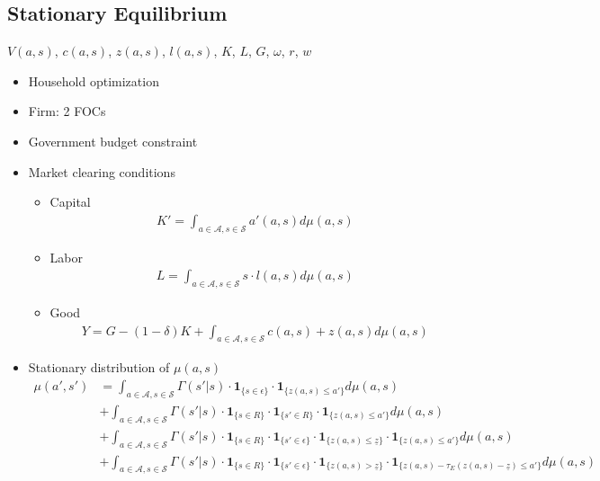 \documentclass{article}
\begin{document}
\begin{spacing}{1.5}
\subsection{Stationary Equilibrium}
$V(a,s)$, $c(a,s)$, $z(a,s)$, $l(a,s)$, $K$, $L$, $G$, $\omega$, $r$, $w$
\begin{itemize}
\item Household optimization
\item Firm: 2 FOCs
\item Government budget constraint
\item Market clearing conditions
\begin{itemize}
\item Capital
\begin{align*}
K'=\int_{a\in\mathcal{A}, s\in\mathcal{S}}a'(a,s)d\mu(a,s)
\end{align*}
\item Labor
\begin{align*}
L=\int_{a\in\mathcal{A}, s\in\mathcal{S}}s\cdot l(a,s)d\mu(a,s)
\end{align*}
\item Good
\begin{align*}
Y=G-(1-\delta)K+\int_{a\in\mathcal{A}, s\in\mathcal{S}}c(a,s)+z(a,s)d\mu(a,s)
\end{align*}
\end{itemize}
\item Stationary distribution of $\mu(a,s)$
\begin{align*}
\mu(a',s')&=\int_{a\in\mathcal{A}, s\in\mathcal{S}} \Gamma(s'|s)\cdot\textbf{1}_{\{s\in\epsilon\}}\cdot\textbf{1}_{\{z(a,s)\leq a'\}}d\mu(a,s)\\
 &+\int_{a\in\mathcal{A}, s\in\mathcal{S}} \Gamma(s'|s)\cdot\textbf{1}_{\{s\in R\}}\cdot\textbf{1}_{\{s'\in R\}}\cdot\textbf{1}_{\{z(a,s)\leq a'\}}d\mu(a,s)\\
 &+\int_{a\in\mathcal{A}, s\in\mathcal{S}} \Gamma(s'|s)\cdot\textbf{1}_{\{s\in R\}}\cdot\textbf{1}_{\{s'\in \epsilon\}}\cdot\textbf{1}_{\{z(a,s)\leq \underline{z}\}}\cdot\textbf{1}_{\{z(a,s)\leq a'\}}d\mu(a,s)\\
 &+\int_{a\in\mathcal{A}, s\in\mathcal{S}} \Gamma(s'|s)\cdot\textbf{1}_{\{s\in R\}}\cdot\textbf{1}_{\{s'\in \epsilon\}}\cdot\textbf{1}_{\{z(a,s)> \underline{z}\}}\cdot\textbf{1}_{\{z(a,s)-\tau_E(z(a,s)-\underline{z})\leq a'\}}d\mu(a,s)\\
\end{align*}
\end{itemize}




\end{spacing}
\end{document}

